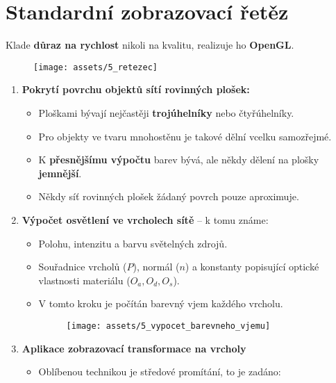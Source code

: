 \section{Standardní zobrazovací řetěz}
Klade \textbf{důraz na rychlost }nikoli na kvalitu, realizuje ho \textbf{OpenGL}.
\begin{figure}[H]
    \centering
    \texttt{[image: assets/5\_retezec]}
\end{figure}

\begin{enumerate}
    \item  \textbf{Pokrytí povrchu objektů sítí rovinných plošek:}
          \begin{itemize}
              \item Ploškami bývají nejčastěji \textbf{trojúhelníky} nebo čtyřúhelníky.
              \item Pro objekty ve tvaru mnohostěnu je takové dělní vcelku samozřejmé.
              \item K \textbf{přesnějšímu výpočtu }barev bývá, ale někdy dělení na plošky \textbf{jemnější}.
              \item Někdy síť rovinných plošek žádaný povrch pouze aproximuje.
          \end{itemize}
    \item \textbf{Výpočet osvětlení ve vrcholech sítě} -- k tomu známe:
          \begin{itemize}
              \item Polohu, intenzitu a barvu světelných zdrojů.
              \item Souřadnice vrcholů ($P$), normál ($n$) a konstanty popisující optické vlastnosti materiálu ($O_a, O_d, O_s$).
              \item V tomto kroku je počítán barevný vjem každého vrcholu.
                    \begin{figure}[H]
                        \centering
                        \texttt{[image: assets/5\_vypocet\_barevneho\_vjemu]}
                    \end{figure}
          \end{itemize}
    \item \textbf{Aplikace zobrazovací transformace na vrcholy}
          \begin{itemize}
              \item Oblíbenou technikou je středové promítání, to je zadáno:

\end{itemize}
\end{enumerate}
